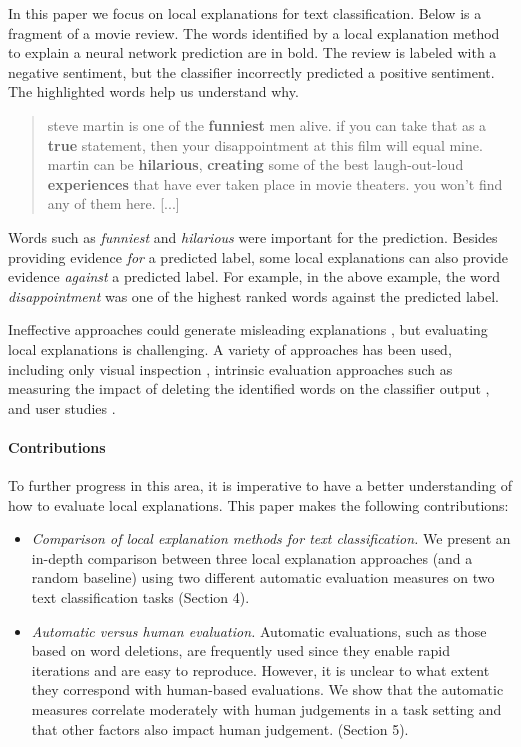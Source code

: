 \documentclass[11pt,a4paper]{article}
\begin{document}
In this paper we focus on local explanations for text classification.
Below is a fragment of a movie review. The words identified by a local explanation method to explain a neural network prediction are in bold. The review is labeled with a negative sentiment, but the classifier incorrectly predicted a positive sentiment. The highlighted words help us understand why.

\begin{quote}
steve martin is one of the \textbf{funniest} men alive. if you can take that as a \textbf{true} statement, then your disappointment at this film will equal mine. martin can be \textbf{hilarious}, \textbf{creating} some of the best laugh-out-loud \textbf{experiences} that have ever taken place in movie theaters. you won't find any of them here. [...]
\end{quote}

 Words such as \emph{funniest} and \emph{hilarious} were important for the prediction. Besides providing evidence \emph{for} a predicted label, some local explanations can also provide evidence \emph{against} a predicted label. 
For example, in the above example, the word \emph{disappointment} was one of the highest ranked words against the predicted label.



Ineffective approaches could generate misleading explanations \cite{DBLP:journals/corr/Lipton16a}, but evaluating local explanations is challenging. A variety of approaches has been used, including only visual inspection \cite{ding-EtAl:2017:Long,li-EtAl:2016:N16-12},  intrinsic evaluation approaches such as measuring the impact of deleting the identified words on the classifier output \cite{arras2016explaining}, and user studies \cite{Kulesza:2015:PED:2678025.2701399}. 

\paragraph*{Contributions}
 To further progress in this area, it is imperative to have a better understanding of how to evaluate local explanations. This paper makes the following contributions:
 \begin{itemize}
\item  \emph{Comparison of  local explanation methods for text classification.}
 We present an in-depth comparison between three local explanation approaches (and a random baseline) using two different automatic evaluation measures on two text classification tasks (Section 4).
 \item \emph{Automatic versus human evaluation.} Automatic evaluations, such as those based on word deletions, are frequently used since they enable rapid iterations and are easy to reproduce. However, it is  unclear to what extent they correspond with human-based evaluations.    We show that the automatic measures correlate moderately with human judgements  in a task setting  and that other factors also impact  human judgement. (Section 5).

\end{itemize}
 
\end{document}
